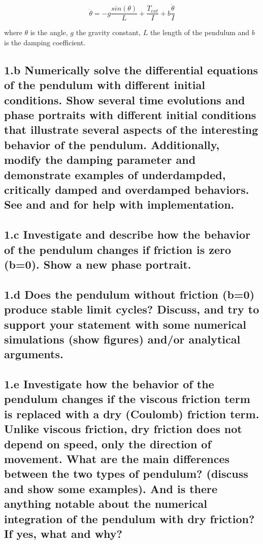 \documentclass{cmc}
\begin{document}
\begin{equation}
  \label{eq:pendulum}
  \ddot{\theta} = -g\frac{sin(\theta)}{L} + \frac{T_{ext}}{I} + b \frac{\dot{\theta}}{I}
\end{equation}

where $\theta$ is the angle, $g$ the gravity constant, $L$ the length of the pendulum
and $b$ is the damping coefficient.


\subsection*{1.b Numerically solve the differential equations of the pendulum
  with different initial conditions.  Show several time evolutions and phase
  portraits with different initial conditions that illustrate several aspects of
  the interesting behavior of the pendulum. Additionally, modify the damping parameter
  and demonstrate examples of underdampded, critically damped and overdamped behaviors.
  See  and  and
   for help with implementation.}


\subsection*{1.c Investigate and describe how the behavior of the pendulum
  changes if friction is zero (b=0).  Show a new phase portrait.}


\subsection*{1.d Does the pendulum without friction (b=0) produce stable limit
  cycles? Discuss, and try to support your statement with some numerical
  simulations (show figures) and/or analytical arguments.}


\subsection*{1.e Investigate how the behavior of the pendulum changes if the
  viscous friction term is replaced with a dry (Coulomb) friction term. Unlike
  viscous friction, dry friction does not depend on speed, only the direction of
  movement. What are the main differences between the two types of pendulum?
  (discuss and show some examples). And is there anything notable about the
  numerical integration of the pendulum with dry friction? If yes, what and why?}
\end{document}
